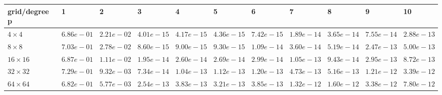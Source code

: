 \begin{tabular}{lllllllllll}
\hline
 grid/degree p   & 1          & 2          & 3          & 4          & 5          & 6          & 7          & 8          & 9          & 10         \\
\hline
 $4 \times 4$    & $6.86e-01$ & $2.21e-02$ & $4.01e-15$ & $4.17e-15$ & $4.36e-15$ & $7.42e-15$ & $1.89e-14$ & $3.65e-14$ & $7.55e-14$ & $2.88e-13$ \\
 $8 \times 8$    & $7.03e-01$ & $2.78e-02$ & $8.60e-15$ & $9.00e-15$ & $9.30e-15$ & $1.09e-14$ & $3.60e-14$ & $5.19e-14$ & $2.47e-13$ & $5.00e-13$ \\
 $16 \times 16$  & $6.87e-01$ & $1.11e-02$ & $1.95e-14$ & $2.60e-14$ & $2.69e-14$ & $2.99e-14$ & $1.05e-13$ & $9.43e-14$ & $2.95e-13$ & $8.72e-13$ \\
 $32 \times 32$  & $7.29e-01$ & $9.32e-03$ & $7.34e-14$ & $1.04e-13$ & $1.12e-13$ & $1.20e-13$ & $4.73e-13$ & $5.16e-13$ & $1.21e-12$ & $3.39e-12$ \\
 $64 \times 64$  & $6.82e-01$ & $5.77e-03$ & $2.54e-13$ & $3.83e-13$ & $3.21e-13$ & $3.85e-13$ & $1.32e-12$ & $1.60e-12$ & $3.38e-12$ & $7.80e-12$ \\
\hline
\end{tabular}